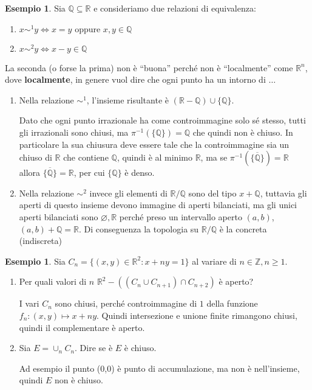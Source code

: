 \documentclass{article}
\newcounter{theo}[section]\setcounter{theo}{0}
\newcounter{excounter}[section]\setcounter{excounter}{0}
\theoremstyle{plain}
\theoremstyle{definition}
\newtheorem{example}[excounter]{Esempio}
\theoremstyle{remark}
\begin{document}
\begin{example}
    Sia \(\mathbb{Q} \subseteq \mathbb{R} \) e consideriamo due relazioni di
    equivalenza:
\begin{enumerate}[label = \arabic*)]
    \item \(x \sim^{1} y \iff x = y \text{ oppure } x, y \in  \mathbb{Q}\) 
    \item  \(x \sim^{2} y \iff x - y \in  \mathbb{Q}\) 
\end{enumerate}
La seconda (o forse la prima) non è ``buona'' perché non è ``localmente'' come
\(\mathbb{R}^{n}\), dove \textbf{localmente}, in genere vuol dire che ogni punto ha un
intorno di \(\dots\) 

\begin{enumerate}[label = \arabic*)]
    \item Nella relazione \(\sim^{1}\), l'insieme risultante è \((\mathbb{R} -
        \mathbb{Q}) \cup \{\mathbb{Q}\} \).

        Dato che ogni punto irrazionale ha come controimmagine solo sé stesso,
        tutti gli irrazionali sono chiusi, ma \(\pi ^{-1}(\{\mathbb{Q}\} ) =
        \mathbb{Q}\) che quindi non è chiuso. In particolare la sua chiusura
        deve essere tale che la controimmagine sia un chiuso di \(\mathbb{R}\)
        che contiene \(\mathbb{Q}\), quindi è al minimo \(\mathbb{R}\), ma se
        \(\pi ^{-1}(\overline{\{\mathbb{Q}\}}) = \mathbb{R}\) allora
        \(\overline{\{\mathbb{Q}\} } = \mathbb{R}\), per cui \(\{\mathbb{Q}\} \)
        è denso.
    \item Nella relazione \(\sim^{2}\) invece gli elementi di \(\mathbb{R} /
        \mathbb{Q}\) sono del tipo \(x + \mathbb{Q}\), tuttavia gli aperti di
        questo insieme devono immagine di aperti bilanciati, ma gli
        unici aperti bilanciati sono \(\varnothing, \mathbb{R}\) perché preso un
        intervallo aperto \((a, b)\), \((a, b) + \mathbb{Q} = \mathbb{R}\). 
        Di conseguenza la topologia su \(\mathbb{R} / \mathbb{Q}\)  è la
        concreta (indiscreta)
\end{enumerate}
\end{example}

\begin{example}
    Sia \(C_n = \{(x, y) \in \mathbb{R}^2 : x + ny = 1\} \) al variare di \(n
    \in \mathbb{Z}, n \ge 1\).
\begin{enumerate}[label = \arabic*.]
    \item Per quali valori di \(n\) \(\mathbb{R}^2 - ((C_n \cup C_{n+1}) \cap
        C_{n+2})\) è aperto?

        I vari \(C_n\) sono chiusi, perché controimmagine di \(1\) della
        funzione \(f_n: (x,y) \mapsto x + ny\). Quindi intersezione e unione
        finite rimangono chiusi, quindi il complementare è aperto.
    \item Sia \(E = \cup_n C_n\). Dire se è \(E\) è chiuso.
        
        Ad esempio il punto (0,0) è punto di accumulazione, ma non è
        nell'insieme, quindi \(E\) non è chiuso.
\end{enumerate}
\end{example}
\end{document}
